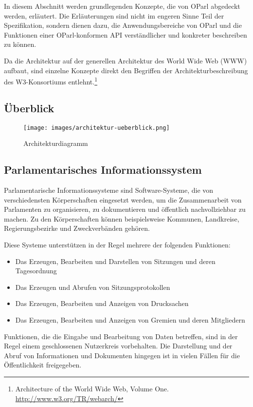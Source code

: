 \documentclass[,a4paper]{article}
\makeatletter
\def\maxwidth{\ifdim\Gin@nat@width>\linewidth\linewidth
\else\Gin@nat@width\fi}
\let\Oldincludegraphics\includegraphics
\renewcommand{\includegraphics}[1]{\Oldincludegraphics[width=\maxwidth]{#1}}
\makeatother
\begin{document}
In diesem Abschnitt werden grundlegenden Konzepte, die von OParl
abgedeckt werden, erläutert. Die Erläuterungen sind nicht im engeren
Sinne Teil der Spezifikation, sondern dienen dazu, die
Anwendungsbereiche von OParl und die Funktionen einer OParl-konformen
API verständlicher und konkreter beschreiben zu können.

Da die Architektur auf der generellen Architektur des World Wide Web
(WWW) aufbaut, sind einzelne Konzepte direkt den Begriffen der
Architekturbeschreibung des W3-Konsortiums entlehnt.\footnote{Architecture
  of the World Wide Web, Volume One. \url{http://www.w3.org/TR/webarch/}}

\subsection{Überblick}\label{uxfcberblick}

\begin{figure}[htbp]
\centering
\texttt{[image: images/architektur-ueberblick.png]}
\caption{Architekturdiagramm}
\end{figure}

\subsection{Parlamentarisches
Informationssystem}\label{parlamentarischesux5finfosystem}

Parlamentarische Informationssysteme sind Software-Systeme, die von
verschiedensten Körperschaften eingesetzt werden, um die Zusammenarbeit
von Parlamenten zu organisieren, zu dokumentieren und öffentlich
nachvollziehbar zu machen. Zu den Körperschaften können beispielsweise
Kommunen, Landkreise, Regierungsbezirke und Zweckverbänden gehören.

Diese Systeme unterstützen in der Regel mehrere der folgenden
Funktionen:

\begin{itemize}
\itemsep1pt\parskip0pt
\item
  Das Erzeugen, Bearbeiten und Darstellen von Sitzungen und deren
  Tagesordnung
\item
  Das Erzeugen und Abrufen von Sitzungsprotokollen
\item
  Das Erzeugen, Bearbeiten und Anzeigen von Drucksachen
\item
  Das Erzeugen, Bearbeiten und Anzeigen von Gremien und deren
  Mitgliedern
\end{itemize}

Funktionen, die die Eingabe und Bearbeitung von Daten betreffen, sind in
der Regel einem geschlossenen Nutzerkreis vorbehalten. Die Darstellung
und der Abruf von Informationen und Dokumenten hingegen ist in vielen
Fällen für die Öffentlichkeit freigegeben.
\end{document}
